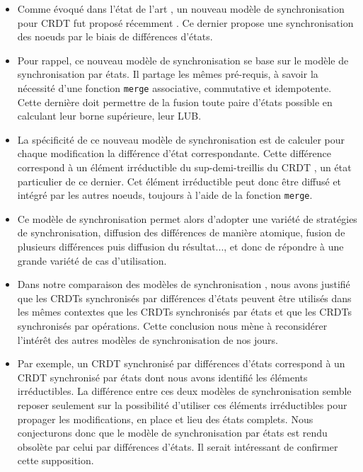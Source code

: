 \begin{itemize}
  \item Comme évoqué dans l'état de l'art , un nouveau modèle de synchronisation pour \ac{CRDT} fut proposé récemment \cite{almeida2015delta}.
    Ce dernier propose une synchronisation des noeuds par le biais de différences d'états.
  \item Pour rappel, ce nouveau modèle de synchronisation se base sur le modèle de synchronisation par états.
    Il partage les mêmes pré-requis, à savoir la nécessité d'une fonction \texttt{merge} associative, commutative et idempotente.
    Cette dernière doit permettre de la fusion toute paire d'états possible en calculant leur borne supérieure, \ie leur \ac{LUB}.
  \item La spécificité de ce nouveau modèle de synchronisation est de calculer pour chaque modification la différence d'état correspondante.
    Cette différence correspond à un élément irréductible du sup-demi-treillis du \ac{CRDT} \cite{enes2019}, \ie un état particulier de ce dernier.
    Cet élément irréductible peut donc être diffusé et intégré par les autres noeuds, toujours à l'aide de la fonction \texttt{merge}.
  \item Ce modèle de synchronisation permet alors d'adopter une variété de stratégies de synchronisation, \eg diffusion des différences de manière atomique, fusion de plusieurs différences puis diffusion du résultat..., et donc de répondre à une grande variété de cas d'utilisation.
  \item Dans notre comparaison des modèles de synchronisation , nous avons justifié que les \acp{CRDT} synchronisés par différences d'états peuvent être utilisés dans les mêmes contextes que les \acp{CRDT} synchronisés par états et que les \acp{CRDT} synchronisés par opérations.
    Cette conclusion nous mène à reconsidérer l'intérêt des autres modèles de synchronisation de nos jours.
  \item Par exemple, un \ac{CRDT} synchronisé par différences d'états correspond à un \ac{CRDT} synchronisé par états dont nous avons identifié les éléments irréductibles.
    La différence entre ces deux modèles de synchronisation semble reposer seulement sur la possibilité d'utiliser ces éléments irréductibles pour propager les modifications, en place et lieu des états complets.
    Nous conjecturons donc que le modèle de synchronisation par états est rendu obsolète par celui par différences d'états.
    Il serait intéressant de confirmer cette supposition.

\end{itemize}
